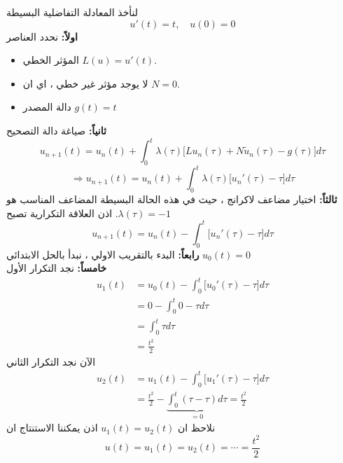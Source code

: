 \begin{example}
	لنأخذ المعادلة التفاضلية البسيطة
	\[
	u'(t) = t, \quad u(0) = 0
	\]
	\textbf{اولاً:} نحدد العناصر 
	\begin{itemize}
		\item المؤثر الخطي $L(u) = u'(t)$.
		\item لا يوجد مؤثر غير خطي ، اي ان $N=0$.
		\item دالة المصدر $g(t) = t$
	\end{itemize}
	\textbf{ثانياً:} صياغة دالة التصحيح
	\[
	u_{n+1}(t) = u_n(t) + \int_{0}^{t} \lambda(\tau) \Big[L u_n(\tau) + N \tilde{u}_n(\tau) - g(\tau)\Big] d\tau
	\]
	\[
	\Rightarrow
	u_{n+1}(t) = u_n(t) + \int_{0}^{t} \lambda(\tau) \Big[u_n'(\tau)   - \tau\Big] d\tau
	\]
	\textbf{ثالثاً:} اختيار مضاعف لاكرانج ، حيث في هذه الحالة البسيطة المضاعف المناسب هو $\lambda(\tau) = -1$.
	اذن العلاقة التكرارية تصبح
	\[
	u_{n+1}(t) = u_n(t) - \int_{0}^{t}  \Big[u_n'(\tau)   - \tau\Big] d\tau
	\]
	\textbf{رابعاً:} البدء بالتقريب الاولي ، نبدأ بالحل الابتدائي 
	$u_0(t) = 0$\\
	\textbf{خامساً:} نجد التكرار الأول
	\begin{align*}
		u_{1}(t) &= u_0(t) - \int_{0}^{t} \Big[u_0'(\tau)   - \tau\Big] d\tau\\
		& = 0 - \int_{0}^{t} 0 - \tau d\tau\\
		& = \int_{0}^{t} \tau d\tau \\
		& = \frac{t^2}{2}
	\end{align*}
	الآن نجد التكرار الثاني
	\begin{align*}
		u_{2}(t) &= u_1(t) - \int_{0}^{t} \Big[u_1'(\tau)   - \tau\Big] d\tau\\
		& = \frac{t^2}{2} - \underbrace{\int_{0}^{t} (\tau - \tau) d \tau}_{ = 0} = \frac{t^2}{2}
	\end{align*}
	نلاحظ ان 
	$u_1(t) = u_2(t)$ اذن يمكننا الاستنتاج ان
	\[
	u(t) = u_1(t) = u_2(t) = \cdots = \frac{t^2}{2}
	\]
\end{example}

